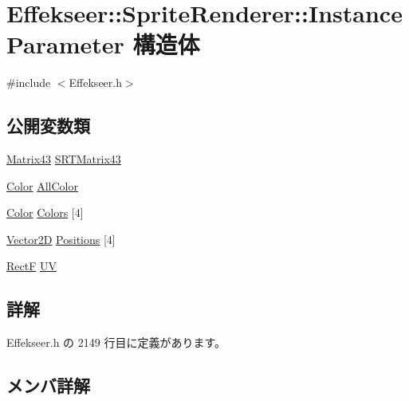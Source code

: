 \hypertarget{struct_effekseer_1_1_sprite_renderer_1_1_instance_parameter}{}\section{Effekseer\+:\+:Sprite\+Renderer\+:\+:Instance\+Parameter 構造体}
\label{struct_effekseer_1_1_sprite_renderer_1_1_instance_parameter}


{\ttfamily \#include $<$Effekseer.\+h$>$}

\subsection*{公開変数類}
\begin{DoxyCompactItemize}
\item 
\mbox{\hyperlink{struct_effekseer_1_1_matrix43}{Matrix43}} \mbox{\hyperlink{struct_effekseer_1_1_sprite_renderer_1_1_instance_parameter_ac25f3a2b7f290ac99b8c50b0eaf92339}{S\+R\+T\+Matrix43}}
\item 
\mbox{\hyperlink{struct_effekseer_1_1_color}{Color}} \mbox{\hyperlink{struct_effekseer_1_1_sprite_renderer_1_1_instance_parameter_a7160592889f3f59c114094b3cc8f9cd5}{All\+Color}}
\item 
\mbox{\hyperlink{struct_effekseer_1_1_color}{Color}} \mbox{\hyperlink{struct_effekseer_1_1_sprite_renderer_1_1_instance_parameter_ae745017c89a18992eecfcc14c4f5f763}{Colors}} \mbox{[}4\mbox{]}
\item 
\mbox{\hyperlink{struct_effekseer_1_1_vector2_d}{Vector2D}} \mbox{\hyperlink{struct_effekseer_1_1_sprite_renderer_1_1_instance_parameter_a6182e946041958ddc8e63b59165a9249}{Positions}} \mbox{[}4\mbox{]}
\item 
\mbox{\hyperlink{struct_effekseer_1_1_rect_f}{RectF}} \mbox{\hyperlink{struct_effekseer_1_1_sprite_renderer_1_1_instance_parameter_aedec84f7ebb3f45f2a8057990f3907ba}{UV}}
\end{DoxyCompactItemize}


\subsection{詳解}


 Effekseer.\+h の 2149 行目に定義があります。



\subsection{メンバ詳解}
\mbox{\label{struct_effekseer_1_1_sprite_renderer_1_1_instance_parameter_a7160592889f3f59c114094b3cc8f9cd5}} 
